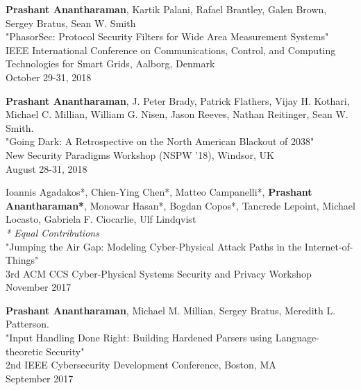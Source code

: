 \documentclass[letterpaper,10pt]{article}
\begin{document}
	\begin{etaremune}
	\setlength\itemsep{0ex}

	\item {\bf Prashant Anantharaman}, Kartik Palani, Rafael Brantley, Galen Brown, Sergey Bratus, Sean W. Smith\\
		"PhasorSec: Protocol Security Filters for Wide Area Measurement Systems"\\
		IEEE International Conference on Communications, Control, and Computing Technologies for Smart Grids, Aalborg, Denmark\\
		October 29-31, 2018

	\item {\bf Prashant Anantharaman}, J. Peter Brady, Patrick Flathers, Vijay H. Kothari, Michael C. Millian, William G. Nisen, Jason Reeves, Nathan Reitinger, Sean W. Smith.\\
		"Going Dark: A Retrospective on the North American Blackout of 2038"\\
		New Security Paradigms Workshop (NSPW '18), Windsor, UK\\
		August 28-31, 2018

	\item Ioannis Agadakos*, Chien-Ying Chen*, Matteo Campanelli*, {\bf Prashant Anantharaman*}, Monowar Hasan*, Bogdan Copos*, Tancrede Lepoint, Michael Locasto, Gabriela F. Ciocarlie, Ulf Lindqvist \\
		\textit{* Equal Contributions}\\
		"Jumping the Air Gap: Modeling Cyber-Physical Attack Paths in the Internet-of-Things" \\
		 3rd ACM CCS Cyber-Physical Systems Security and Privacy Workshop \\
		 November 2017
	 \item {\bf Prashant Anantharaman}, Michael M. Millian, Sergey Bratus, Meredith L. Patterson.\\
		 "Input Handling Done Right: Building Hardened Parsers using Language-theoretic Security"\\
		 2nd IEEE Cybersecurity Development Conference, Boston, MA\\
		 September 2017


\end{etaremune}
\end{document}
